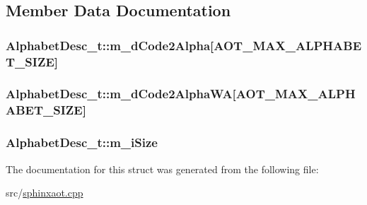 \subsection{Member Data Documentation}
\hypertarget{structAlphabetDesc__t_acbfafafd817f53555b06ed844d6b94ab}{
\subsubsection[{m\-\_\-d\-Code2\-Alpha}]{ Alphabet\-Desc\-\_\-t\-::m\-\_\-d\-Code2\-Alpha\mbox{[}{\bf A\-O\-T\-\_\-\-M\-A\-X\-\_\-\-A\-L\-P\-H\-A\-B\-E\-T\-\_\-\-S\-I\-Z\-E}\mbox{]}}}\label{structAlphabetDesc__t_acbfafafd817f53555b06ed844d6b94ab}
\hypertarget{structAlphabetDesc__t_a9d817cc77461eec22c7d89ae14a7002b}{
\subsubsection[{m\-\_\-d\-Code2\-Alpha\-W\-A}]{ Alphabet\-Desc\-\_\-t\-::m\-\_\-d\-Code2\-Alpha\-W\-A\mbox{[}{\bf A\-O\-T\-\_\-\-M\-A\-X\-\_\-\-A\-L\-P\-H\-A\-B\-E\-T\-\_\-\-S\-I\-Z\-E}\mbox{]}}}\label{structAlphabetDesc__t_a9d817cc77461eec22c7d89ae14a7002b}
\hypertarget{structAlphabetDesc__t_aebcaf8e69dd11f37ce0d25f1ab016bfd}{
\subsubsection[{m\-\_\-i\-Size}]{ Alphabet\-Desc\-\_\-t\-::m\-\_\-i\-Size}}\label{structAlphabetDesc__t_aebcaf8e69dd11f37ce0d25f1ab016bfd}


The documentation for this struct was generated from the following file\-:\begin{DoxyCompactItemize}
\item 
src/\hyperlink{sphinxaot_8cpp}{sphinxaot.\-cpp}\end{DoxyCompactItemize}
